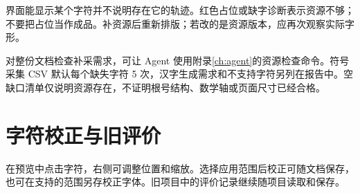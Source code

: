 界面能显示某个字符并不说明存在它的轨迹。红色占位或缺字诊断表示资源不够；不要把占位当作成品。补资源后重新排版；若改的是资源版本，应再次观察实际字形。

对整份文档检查补采需求，可让 Agent 使用附录\ref{ch:agent}的资源检查命令。符号采集 CSV 默认每个缺失字符 5 次，汉字生成需求和不支持字符另列在报告中。空缺口清单仅说明资源存在，不证明根号结构、数学轴或页面尺寸已经合格。

\section{字符校正与旧评价}
在预览中点击字符，右侧可调整位置和缩放。选择应用范围后校正可随文档保存，也可在支持的范围另存校正字体。旧项目中的评价记录继续随项目读取和保存。
